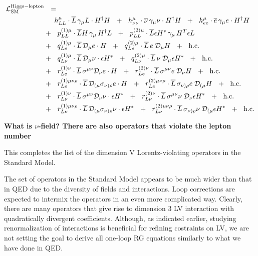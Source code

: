 \documentclass[12pt,preprintnumbers,nofootinbib]{revtex4}
\newcommand{\ov}{\overline}
\newcommand{\md}{\mathcal{D}}
\begin{document}
\begin{align}
\notag
	\mathcal{L}_{\rm SM}^{\rm Higgs-lepton} & ~~=~~
	\\
\notag
	&
	\phantom{+~~}
	h_{LL}^\mu \cdot
	\ov{L}\, \gamma_\mu L \cdot H^\dag H ~~+~~
	h_{\nu\nu}^\mu \cdot
	\ov{\nu}\, \gamma_\mu \nu \cdot H^\dag H ~~+~~
	h_{ee}^\mu \cdot
	\ov{e}\, \gamma_\mu e \cdot H^\dag H 
	\\
\notag
	&
	+~~
	p^{(1)\mu}_{LL} \cdot
	\ov{L}H \, \gamma_\mu\, H^\dag L ~~+~~
	p^{(2)\mu}_{LL} \cdot
	\ov{L}\epsilon H^* \, \gamma_\mu \, H^T \epsilon L 
	\\
\notag
	&
	+~~
	q^{(1)\mu}_{Le} \cdot
	\ov{L}\, \md_\mu e\cdot H ~~+~~
	q^{(2)\mu}_{Le} \cdot
	\ov{L}\, e \; \md_\mu H ~~+~~
	\text{h.c.}
	\\
\notag
	&
	+~~
	q^{(1)\mu}_{L\nu} \cdot
	\ov{L}\, \md_\mu \nu \cdot \epsilon H^* ~~+~~
	q^{(2)\mu}_{L\nu} \cdot
	\ov{L}\, \nu \; \md_\mu \epsilon H^* ~~+~~
	\text{h.c.}
	\\
\notag
	&
	+~~
	r^{(1)\nu}_{Le} \cdot
	\ov{L}\, \sigma^{\mu\nu} \md_\nu e \cdot H ~~+~~
	r^{(2)\nu}_{Le} \cdot
	\ov{L}\, \sigma^{\mu\nu} e\; \md_\nu H ~~+~~
	\text{h.c.}
	\\
\notag
	&
	+~~
	r^{(1)\mu\nu\rho}_{Le} \cdot
	\ov{L}\, \md_{(\mu} \sigma_{\nu)\rho} e \cdot H ~~+~~
	r^{(2)\mu\nu\rho}_{Le} \cdot
	\ov{L}\, \sigma_{\nu)\rho} e \; \md_{(\mu} H ~~+~~
	\text{h.c.}
	\\
\notag
	&
	+~~
	r^{(1)\nu}_{L\nu} \cdot
	\ov{L}\, \sigma^{\mu\nu} \md_\nu \nu \cdot \epsilon H^* ~~+~~
	r^{(2)\nu}_{L\nu} \cdot
	\ov{L}\, \sigma^{\mu\nu} \nu\; \md_\nu \epsilon H^* ~~+~~
	\text{h.c.}
	\\
\notag
	&
	+~~
	r^{(1)\mu\nu\rho}_{L\nu} \cdot
	\ov{L}\, \md_{(\mu} \sigma_{\nu)\rho} \nu \cdot \epsilon H^* ~~+~~
	r^{(2)\mu\nu\rho}_{L\nu} \cdot
	\ov{L}\, \sigma_{\nu)\rho} \nu \; \md_{(\mu} \epsilon H^* ~~+~~
	\text{h.c.}
\end{align}


{\bf What is $\nu$-field? There are also operators that violate the 
lepton number}

	This completes the list of the dimension V Lorentz-violating
	operators in the Standard Model.

	The set of operators in the Standard Model appears to be much
	wider than that in QED due to the diversity of fields and interactions.
	Loop corrections are expected to intermix the operators in an 
	even more complicated way. Clearly, there are many operators that give rise 
	to dimension 3 LV interaction with quadratically divergent coefficients. 
	Although, as indicated earlier, studying renormalization of interactions
	is beneficial for refining costraints on LV,
	we are not setting the goal to derive all one-loop RG
	equations similarly to what we have done in QED.
\end{document}
